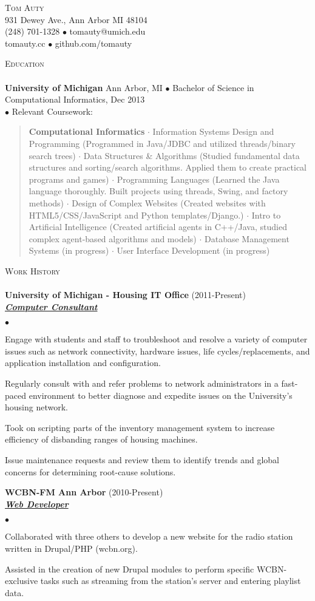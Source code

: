 \documentclass{article}
\newcommand{\area}[2]{\vspace*{-9pt} \begin{verse}\textbf{#1}   #2 \end{verse}  }
\newcommand{\lineunder}{\vspace*{-8pt} \\ \hspace*{-18pt} \hrulefill \\}
\newcommand{\header}[1]{{\hspace*{-15pt}\vspace*{6pt} \textsc{#1}} \vspace*{-6pt} \lineunder}
\newcommand{\employer}[3]{{ \textbf{#1} (#2)\\ \underline{\textbf{\emph{#3}}}\\  }}
\newcommand{\contact}[4]{
\vspace*{-4pt}
\begin{center}
{\LARGE \scshape {#1}}\\
#2 \\
#3 \\
#4
\end{center}
\vspace*{-8pt}
}
\newenvironment{achievements}{\begin{list}{$\bullet$}{\topsep 0pt \itemsep -2pt}}{\vspace*{4pt}\end{list}}
\newcommand{\schoolwithcourses}[4]{
 \textbf{#1} #2 $\bullet$ #3\\ 
#4 $\bullet$  Relevant Coursework:\\
\vspace*{8pt}
}
\begin{document}
\small
\smallskip
\vspace*{-44pt}

\contact{Tom Auty}
{931 Dewey Ave., Ann Arbor MI 48104}
{(248) 701-1328 $\bullet$ tomauty@umich.edu}
{tomauty.cc $\bullet$ github.com/tomauty}

\header{Education}

\schoolwithcourses{University of Michigan}{Ann Arbor, MI}{Bachelor of Science in Computational Informatics, Dec 2013}
{}
	\area{Computational Informatics}{ $\cdot$ Information Systems Design and Programming (Programmed in Java/JDBC and utilized threads/binary search trees) $\cdot$ Data Structures \& Algorithms (Studied fundamental data structures and sorting/search algorithms. Applied them to create practical programs and games) $\cdot$ Programming Languages (Learned the Java language thoroughly. Built projects using threads, Swing, and factory methods) $\cdot$ Design of Complex Websites (Created websites with HTML5/CSS/JavaScript and Python templates/Django.) $\cdot$ Intro to Artificial Intelligence (Created artificial agents in C++/Java, studied complex agent-based algorithms and models) $\cdot$ Database Management Systems (in progress) $\cdot$ User Interface Development (in progress)}

\header{Work History}
\employer{University of Michigan - Housing IT Office}{2011-Present}{Computer Consultant}
	\begin{achievements}
	\item Engage with students and staff to troubleshoot and resolve a variety of computer issues such as network connectivity, hardware issues, life cycles/replacements, and application installation and configuration.
	\item Regularly consult with and refer problems to network administrators in a fast-paced environment to better diagnose and expedite issues on the University's housing network.
	\item Took on scripting parts of the inventory management system to increase efficiency of disbanding ranges of housing machines.
	\item Issue maintenance requests and review them to identify trends and global concerns for determining root-cause solutions.
	\end{achievements}

\employer{WCBN-FM Ann Arbor}{2010-Present}{Web Developer}
	\begin{achievements}
	\item Collaborated with three others to develop a new website for the radio station written in Drupal/PHP (wcbn.org). 
	\item Assisted in the creation of new Drupal modules to perform specific WCBN-exclusive tasks such as streaming from the station's server and entering playlist data.
	\end{achievements}
\end{document}
